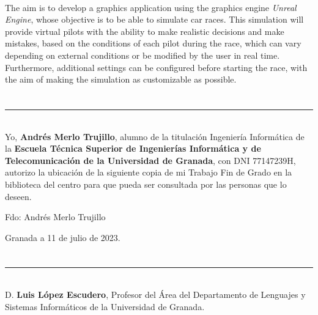\vspace{0.7cm}
\\

The aim is to develop a graphics application using the graphics engine \textit{Unreal Engine}, whose objective is to be able to simulate car races. This simulation will provide virtual pilots with the ability to make realistic decisions and make mistakes, based on the conditions of each pilot during the race, which can vary depending on external conditions or be modified by the user in real time. Furthermore, additional settings can be configured before starting the race, with the aim of making the simulation as customizable as possible.

\chapter*{}
\thispagestyle{empty}

\noindent\rule[-1ex]{\textwidth}{2pt}\\[4.5ex]

Yo, \textbf{Andrés Merlo Trujillo}, alumno de la titulación Ingeniería Informática de la \textbf{Escuela Técnica Superior
de Ingenierías Informática y de Telecomunicación de la Universidad de Granada}, con DNI 77147239H, autorizo la
ubicación de la siguiente copia de mi Trabajo Fin de Grado en la biblioteca del centro para que pueda ser
consultada por las personas que lo deseen.

\vspace{6cm}

\noindent Fdo: Andrés Merlo Trujillo

\vspace{2cm}

\begin{flushright}
Granada a 11 de julio de 2023.
\end{flushright}


\chapter*{}
\thispagestyle{empty}

\noindent\rule[-1ex]{\textwidth}{2pt}\\[4.5ex]

D. \textbf{Luis López Escudero}, Profesor del Área del Departamento de Lenguajes y Sistemas Informáticos de la Universidad de Granada.

\vspace{0.5cm}

